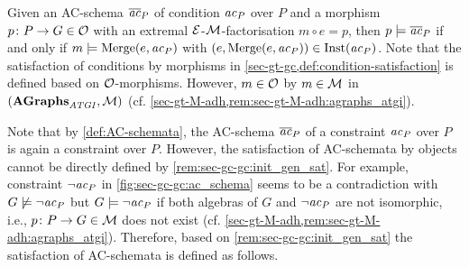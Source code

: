 \vspace*{-10pt}
\pichskip{5pt}
\vspace*{-10pt}
\begin{remark}
\label{rem:sec-gc-gc:schemata}
Given an AC-schema $\overline{\mathit{ac}}_P$ of condition $\mathit{ac}_P$ over $P$ and a morphism $p \colon P \to G \in {\cal O}$ with an extremal $\mathcal{E}$-${\cal M}$-factorisation $m \circ e = p$, then $p \models \overline{\mathit{ac}}_P$ if and only if  $m \models \mathrm{Merge}(e,\mathit{ac}_P)$ with $(e,\mathrm{Merge}(e,\mathit{ac}_P)) \in \mathrm{Inst}(\mathit{ac}_P)$.
Note that the satisfaction of conditions by morphisms in \cref{sec-gt-gc,def:condition-satisfaction} is defined based on ${\cal O}$-morphisms.
However, $m \in {\cal O}$ by $m \in {\cal M}$ in $(\mathbf{AGraphs}_\mathit{ATGI},{\cal M})$ (cf. \cref{sec-gt-M-adh,rem:sec-gt-M-adh:agraphs_atgi}).
\envEndMarker
\end{remark}

Note that by \cref{def:AC-schemata}, the AC-schema $\overline{\mathit{ac}}_P$ of a constraint $\mathit{ac}_P$ over $P$ is again a constraint over $P$.
However, the satisfaction of AC-schemata by objects cannot be directly defined by \cref{rem:sec-gc-gc:init_gen_sat}.
For example, constraint $\neg\mathit{ac}_P$ in \cref{fig:sec-gc-gc:ac_schema} seems to be a contradiction with $G \not\models \neg\mathit{ac}_P$ but $G \models \neg\mathit{ac}_P$ if both algebras of $G$ and $\neg\mathit{ac}_P$ are not isomorphic, i.e., $p\colon P \to G \in {\cal M}$ does not exist (cf. \cref{sec-gt-M-adh,rem:sec-gt-M-adh:agraphs_atgi}).
Therefore, based on \cref{rem:sec-gc-gc:init_gen_sat} the satisfaction of AC-schemata is defined as follows.


